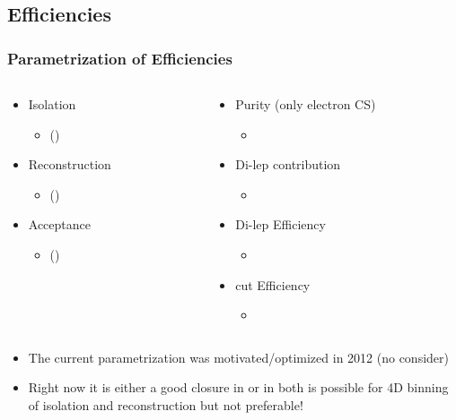 \documentclass{beamer}
\begin{document}
\subsection{Efficiencies}
\begin{frame}
\frametitle{Parametrization of Efficiencies}
  \begin{columns}
    \begin{column}{0.5\textwidth}
     \centering
     \begin{itemize}


        \item Isolation 
   \begin{itemize}
    \item \HT \MHT \NJets (\BTags)
   \end{itemize}
   \item Reconstruction 
   \begin{itemize}
    \item \HT \MHT \NJets (\BTags)
   \end{itemize}
   \item Acceptance 
   \begin{itemize}
    \item \MHT \NJets (\BTags)
   \end{itemize}
     \end{itemize}
    \end{column}
    \begin{column}{0.5\textwidth}
      \centering
        \begin{itemize}
   \item Purity (only electron CS)
   \begin{itemize}
    \item \MHT \NJets 
   \end{itemize}
      \item Di-lep contribution
   \begin{itemize}
    \item \MHT \NJets 
   \end{itemize}
   \item Di-lep Efficiency
   \begin{itemize}
    \item \NJets 
   \end{itemize}
   \item \mt cut Efficiency
   \begin{itemize}
    \item \NJets 
   \end{itemize}
  \end{itemize}
      \centering
    \end{column}
  \end{columns}
  \begin{itemize}
   \item The current parametrization was motivated/optimized in 2012 (no \BTags consider)
   \item Right now it is either a good closure in \NJets or in \BTags both is possible for 4D binning of isolation and reconstruction but not preferable!
 \end{itemize}
\end{frame}
\end{document}
